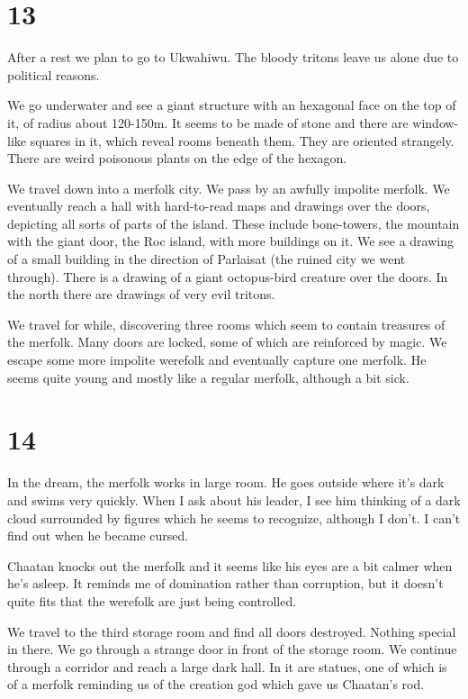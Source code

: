 \documentclass[10pt,a4paper,twoside,openany,hidelinks]{book}
\begin{document}
\chapter*{13}

After a rest we plan to go to Ukwahiwu. The bloody tritons leave us alone due to political reasons.

We go underwater and see a giant structure with an hexagonal face on the top of it, of radius about 120-150m. It seems to be made of stone and there are window-like squares in it, which reveal rooms beneath them. They are oriented strangely.
There are weird poisonous plants on the edge of the hexagon.

We travel down into a merfolk city. We pass by an awfully impolite merfolk. We eventually reach a hall with hard-to-read maps and drawings over the doors, depicting all sorts of parts of the island. These include bone-towers, the mountain with the giant door, the Roc island, with more buildings on it. We see a drawing of a small building in the direction of Parlaisat (the ruined city we went through). There is a drawing of a giant octopus-bird creature over the doors.
In the north there are drawings of very evil tritons.

We travel for while, discovering three rooms which seem to contain treasures of the merfolk. Many doors are locked, some of which are reinforced by magic. We escape some more impolite werefolk and eventually capture one merfolk. He seems quite young and mostly like a regular merfolk, although a bit sick.

\chapter*{14}

In the dream, the merfolk works in large room. He goes outside where it's dark and swims very quickly. When I ask about his leader, I see him thinking of a dark cloud surrounded by figures which he seems to recognize, although I don't. I can't find out when he became cursed.

Chaatan knocks out the merfolk and it seems like his eyes are a bit calmer when he's asleep. It reminds me of domination rather than corruption, but it doesn't quite fits that the werefolk are just being controlled.

We travel to the third storage room and find all doors destroyed. Nothing special in there. We go through a strange door in front of the storage room. We continue through a corridor and reach a large dark hall. In it are statues, one of which is of a merfolk reminding us of the creation god which gave us Chaatan's rod.
\end{document}

